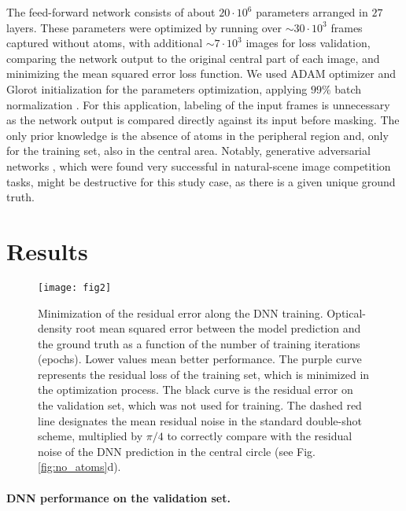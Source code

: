 \documentclass[twocolumn,groupedaddress,longbibliography]{revtex4-1}
\begin{document}
The feed-forward network consists of about $20\cdot10^6$ parameters arranged in $27$ layers. These parameters were optimized by running over $\sim30\cdot10^3$ frames captured without atoms, with additional $\sim7\cdot10^3$ images for loss validation, comparing the network output to the original central part of each image, and minimizing the mean squared error loss function. 
We used ADAM optimizer \cite{Kingma2014} and Glorot initialization \cite{glorot2010understanding} for the parameters optimization, applying $99\%$ batch normalization \cite{Ioffe2015}.
For this application, labeling of the input frames is unnecessary as the network output is compared directly against its input before masking. The only prior knowledge is the absence of atoms in the peripheral region and, only for the training set, also in the central area.
Notably, generative adversarial networks \cite{Goodfellow2014}, which were found very successful in natural-scene image competition tasks, might be destructive for this study case, as there is a given unique ground truth.


\section{Results}

\begin{figure}
\centering
\texttt{[image: fig2]}
\caption{Minimization of the residual error along the DNN training. Optical-density root mean squared error between the model prediction and the ground truth as a function of the number of training iterations (epochs). Lower values mean better performance. The purple curve represents the residual loss of the training set, which is minimized in the optimization process. The black curve is the residual error on the validation set, which was not used for training. The dashed red line designates the mean residual noise in the standard double-shot scheme, multiplied by $\pi/4$ to correctly compare with the residual noise of the DNN prediction in the central circle (see Fig.\,\ref{fig:no_atoms}d).
}
\label{fig:loss}
\end{figure}

\paragraph*{DNN performance on the validation set.}
\end{document}
